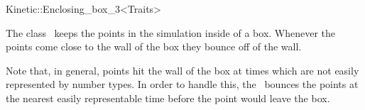 

\begin{ccRefClass}{Kinetic::Enclosing_box_3<Traits>}  %


\ccDefinition
  
The class \ccRefName\ keeps the points in the simulation inside of a
box. Whenever the points come close to the wall of the box they bounce off of the wall.

Note that, in general, points hit the wall of the box at times which
are not easily represented by number types. In order to handle this,
the \ccRefName\ bounces the points at the nearest easily representable
time before the point would leave the box.


\ccTypes


\ccCreation
{}  %




\end{ccRefClass}


